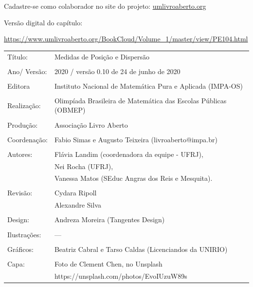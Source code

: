 \vspace*{.3cm}

Cadastre-se como colaborador no site do projeto: \url{umlivroaberto.org}

Versão digital do capítulo:

\url{https://www.umlivroaberto.org/BookCloud/Volume_1/master/view/PE104.html}


\begin{tabular}{p{}p{}}
Título: & Medidas de Posição e Dispersão\\
\\
Ano/ Versão: & 2020 / versão 0.10 de 24 de junho de 2020\\
\\
Editora & Instituto Nacional de Matem\'atica Pura e Aplicada (IMPA-OS)\\
\\
Realização:& Olimp\'iada Brasileira de Matem\'atica das Escolas P\'ublicas (OBMEP)\\
\\
Produção:& Associação Livro Aberto\\
\\
Coordenação: & Fabio Simas e Augusto Teixeira (livroaberto@impa.br)\\
\\
  Autores: & Flávia Landim (coordenadora da equipe - UFRJ),\\
        & Nei Rocha (UFRJ),\\
             & Vanessa Matos (SEduc Angras dos Reis e Mesquita).\\
\\
Revisão: &  Cydara Ripoll  \\
		 &  Alexandre Silva \\
\\
Design: & Andreza Moreira (Tangentes Design) \\
\\
  Ilustrações: & --- \\ 
\\
Gráficos: & Beatriz Cabral e Tarso Caldas (Licenciandos da UNIRIO)\\
\\
  Capa: & Foto de Clement Chen, no Unsplash\\
  		& https://unsplash.com/photos/EvoIUzuW89s \\

\end{tabular}


